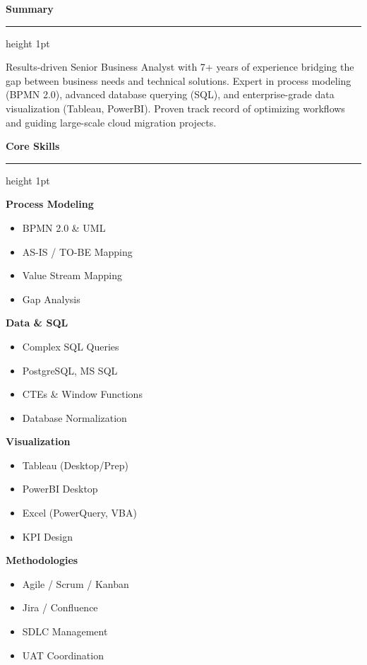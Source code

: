 \documentclass[10pt]{article}
\newcommand{\ressection}[1]{%
  \vspace{0.8em}%
  {\large\bfseries\color{primary} #1}%
  \vspace{0.2em}%
  {\color{accent}\hrule height 1pt}%
  \vspace{0.5em}%
}
\begin{document}
\begin{minipage}[t]{0.34\textwidth}
  \ressection{Summary}
  \color{textdark}\small
  Results-driven Senior Business Analyst with 7+ years of experience bridging the gap between business needs and technical solutions. Expert in process modeling (BPMN 2.0), advanced database querying (SQL), and enterprise-grade data visualization (Tableau, PowerBI). Proven track record of optimizing workflows and guiding large-scale cloud migration projects.
  
  \ressection{Core Skills}
  \begin{skillsbox}
    \color{textdark}\small
    \textbf{Process Modeling}
    \begin{itemize}[leftmargin=1.0em, topsep=2pt, itemsep=2pt, parsep=0pt]
      \item BPMN 2.0 \& UML
      \item AS-IS / TO-BE Mapping
      \item Value Stream Mapping
      \item Gap Analysis
    \end{itemize}
    \vspace{0.6em}
    
    \textbf{Data \& SQL}
    \begin{itemize}[leftmargin=1.0em, topsep=2pt, itemsep=2pt, parsep=0pt]
      \item Complex SQL Queries
      \item PostgreSQL, MS SQL
      \item CTEs \& Window Functions
      \item Database Normalization
    \end{itemize}
    \vspace{0.6em}
    
    \textbf{Visualization}
    \begin{itemize}[leftmargin=1.0em, topsep=2pt, itemsep=2pt, parsep=0pt]
      \item Tableau (Desktop/Prep)
      \item PowerBI Desktop
      \item Excel (PowerQuery, VBA)
      \item KPI Design
    \end{itemize}
    \vspace{0.6em}
    
    \textbf{Methodologies}
    \begin{itemize}[leftmargin=1.0em, topsep=2pt, itemsep=2pt, parsep=0pt]
      \item Agile / Scrum / Kanban
      \item Jira / Confluence
      \item SDLC Management
      \item UAT Coordination
    \end{itemize}
  \end{skillsbox}
  

\end{minipage}
\end{document}
